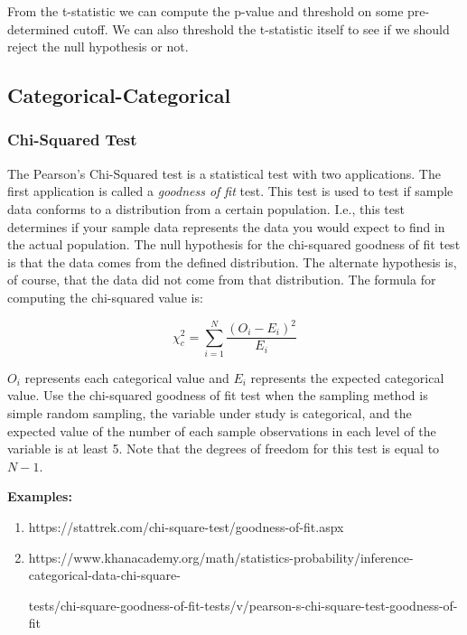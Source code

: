 \documentclass{article}
\begin{document}
\noindent
From the t-statistic we can compute the p-value and threshold on some pre-determined cutoff. We can also threshold the t-statistic itself to see if we should reject the null hypothesis or not. 



\subsection{Categorical-Categorical}
\subsubsection*{Chi-Squared Test}
The Pearson's Chi-Squared test is a statistical test with two applications. The first application is called a \textit{goodness of fit} test. This test is used to test if sample data conforms to a distribution from a certain population. I.e., this test determines if your sample data represents the data you would expect to find in the actual population. The null hypothesis for the chi-squared goodness of fit test is that the data comes from the defined distribution. The alternate hypothesis is, of course, that the data did not come from that distribution. The formula for computing the chi-squared value is:

\[\chi^2_c = \sum_{i=1}^N\frac{(O_i - E_i)^2}{E_i}\]

\noindent
$O_i$ represents each categorical value and $E_i$ represents the expected categorical value. Use the chi-squared goodness of fit test when the sampling method is simple random sampling, the variable under study is categorical, and the expected value of the number of each sample observations in each level of the variable is at least 5. Note that the degrees of freedom for this test is equal to $N - 1$. 

\vspace{3mm}
\textbf{Examples:}
\begin{enumerate}
\item
https://stattrek.com/chi-square-test/goodness-of-fit.aspx
\item
https://www.khanacademy.org/math/statistics-probability/inference-categorical-data-chi-square-

tests/chi-square-goodness-of-fit-tests/v/pearson-s-chi-square-test-goodness-of-fit
\end{enumerate}
\end{document}
